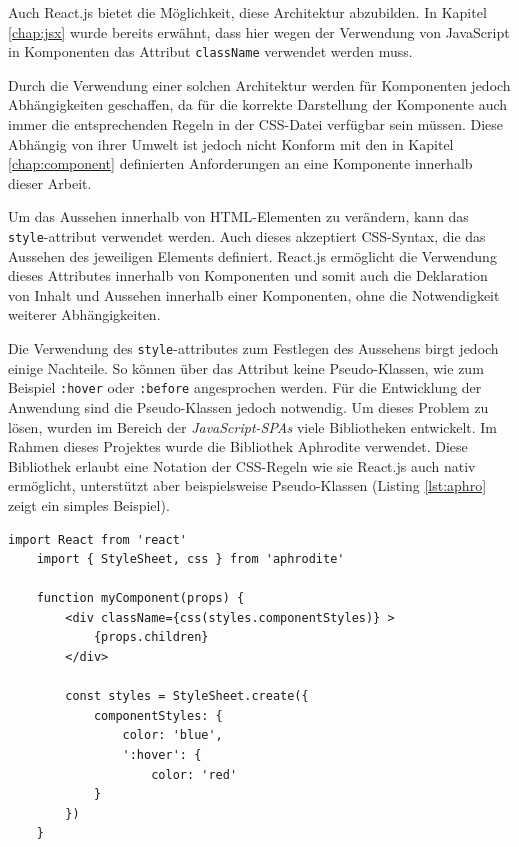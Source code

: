 Auch React.js bietet die Möglichkeit, diese Architektur abzubilden. In Kapitel \ref{chap:jsx} wurde bereits erwähnt, dass hier wegen der Verwendung von JavaScript in Komponenten das Attribut \verb|className| verwendet werden muss.

Durch die Verwendung einer solchen Architektur werden für Komponenten jedoch Abhängigkeiten geschaffen, da für die korrekte Darstellung der Komponente auch immer die entsprechenden Regeln in der CSS-Datei verfügbar sein müssen.
Diese Abhängig von ihrer Umwelt ist jedoch nicht Konform mit den in Kapitel \ref{chap:component} definierten Anforderungen an eine Komponente innerhalb dieser Arbeit.

Um das Aussehen innerhalb von HTML-Elementen zu verändern, kann das \verb|style|-attribut verwendet werden. Auch dieses akzeptiert CSS-Syntax, die das Aussehen des jeweiligen Elements definiert.
React.js ermöglicht die Verwendung dieses Attributes innerhalb von Komponenten und somit auch die Deklaration von Inhalt und Aussehen innerhalb einer Komponenten, ohne die Notwendigkeit weiterer Abhängigkeiten.

Die Verwendung des \verb|style|-attributes zum Festlegen des Aussehens birgt jedoch einige Nachteile. So können über das Attribut keine Pseudo-Klassen, wie zum Beispiel \verb|:hover| oder \verb|:before| angesprochen werden. \cite{w3c2017styles}
Für die Entwicklung der Anwendung sind die Pseudo-Klassen jedoch notwendig.
Um dieses Problem zu lösen, wurden im Bereich der \textit{JavaScript-SPAs} viele Bibliotheken entwickelt. Im Rahmen dieses Projektes wurde die Bibliothek Aphrodite\footnotemark{} verwendet.
Diese Bibliothek erlaubt eine Notation der CSS-Regeln wie sie React.js auch nativ ermöglicht, unterstützt aber beispielsweise Pseudo-Klassen (Listing \ref{lst:aphro} zeigt ein simples Beispiel).


\begin{lstlisting}[caption=Beipspielhafte Verwendung der Bibliothek Aphrodite, label=lst:aphro]
	import React from 'react'
	import { StyleSheet, css } from 'aphrodite'

	function myComponent(props) {
		<div className={css(styles.componentStyles)} >
			{props.children}
		</div>

		const styles = StyleSheet.create({
			componentStyles: {
				color: 'blue',
				':hover': {
					color: 'red'
			}
		})
	}
\end{lstlisting}

